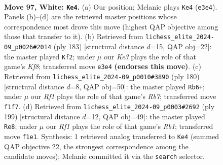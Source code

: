 \documentclass[11pt]{article}
\begin{document}
\clearpage

\begin{figure}[p]\centering
\begin{subfigure}{0.46\textwidth}\centering
\resizebox{\linewidth}{!}{%
\newchessgame
\chessboard[
  setfen={1r6/1Pk5/8/6R1/8/4K3/b7/5R2 w - - 1 97},
  showmover=false,
  pgfstyle=straightmove, color=movearrow, markmove={e3-e4}
]}
\caption{}
\end{subfigure}\hfill
\begin{subfigure}{0.46\textwidth}\centering
\resizebox{\linewidth}{!}{%
\newchessgame
\chessboard[
  setfen={8/8/8/8/r3p3/4R3/3K4/5k2 b - - 29 92},
  showmover=false,
  pgfstyle=straightmove, color=movearrow, markmove={f1-f2}
]}
\caption{}
\end{subfigure}
\\[4pt]
\begin{subfigure}{0.46\textwidth}\centering
\resizebox{\linewidth}{!}{%
\newchessgame
\chessboard[
  setfen={8/1R6/5kP1/6r1/8/8/8/5K2 w - - 13 91},
  showmover=false,
  pgfstyle=straightmove, color=movearrow, markmove={b7-b6}
]}
\caption{}
\end{subfigure}\hfill
\begin{subfigure}{0.46\textwidth}\centering
\resizebox{\linewidth}{!}{%
\newchessgame
\chessboard[
  setfen={1r4k1/8/8/6pR/6K1/8/8/8 b - - 29 100},
  showmover=false,
  pgfstyle=straightmove, color=movearrow, markmove={b8-e8}
]}
\caption{}
\end{subfigure}
\caption{\textbf{Move 97, White: \texttt{Ke4}.} (a) Our position; Melanie plays \texttt{Ke4} (\texttt{e3e4}). Panels (b)--(d) are the retrieved master positions whose correspondence most drove this move (highest QAP objective among those that transfer to it). (b) Retrieved from \texttt{lichess\_elite\_2024-09\_p0026\#2014} (ply 183) [structural distance $d$=15, QAP obj=22]: the master played \texttt{Kf2}; under $\mu$ our \emph{Ke3} plays the role of that game's \emph{Kf8}; transferred move \texttt{e3e4} \textbf{(endorses this move)}. (c) Retrieved from \texttt{lichess\_elite\_2024-09\_p0010\#3890} (ply 180) [structural distance $d$=8, QAP obj=50]: the master played \texttt{Rb6+}; under $\mu$ our \emph{Rf1} plays the role of that game's \emph{Rb7}; transferred move \texttt{f1f7}. (d) Retrieved from \texttt{lichess\_elite\_2024-09\_p0003\#2692} (ply 199) [structural distance $d$=12, QAP obj=49]: the master played \texttt{Re8}; under $\mu$ our \emph{Rf1} plays the role of that game's \emph{Rb1}; transferred move \texttt{f1e1}. Synthesis: 1 retrieved analog transferred to \texttt{Ke4} (summed QAP objective 22, the strongest correspondence among the candidate moves); Melanie committed it via the \texttt{search} selector.}
\label{fig:thought-m192}
\end{figure}
\end{document}
